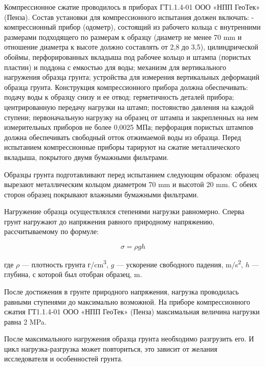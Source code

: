 Компрессионное сжатие проводилось в приборах ГТ1.1.4-01 ООО «НПП ГеоТек» (Пенза).
Состав установки для компрессионного испытания должен включать: 
- компрессионный прибор (одометр), состоящий из рабочего кольца с
внутренними размерами подходящего по размерам к образцу (диаметр не менее 70 \si{\milli\meter} 
и отношение диаметра к высоте должно составлять от 2,8 до 3,5), цилиндрической обоймы,
перфорированных вкладыша под рабочее кольцо и штампа (пористых
пластин) и поддона с емкостью для воды; механизм для вертикального нагружения образца грунта; 
устройства для измерения вертикальных деформаций образца грунта.
Конструкция компрессионного прибора должна обеспечивать: подачу воды к образцу снизу и ее отвод; 
герметичность деталей прибора; центрированную передачу нагрузки на штамп; постоянство давления 
на каждой ступени; первоначальную нагрузку на образец от штампа и закрепленных на нем
измерительных приборов не более 0,0025 МПа; перфорация пористых штампов должна 
обеспечивать свободный отток отжимаемой воды из образца.
Перед испытанием компрессионные приборы тарируют на сжатие металлического 
вкладыша, покрытого двумя бумажными фильтрами.

Образцы грунта подготавливают перед испытанием следующим образом:
образец вырезают металлическим кольцом диаметром 70 \si{\milli\meter} 
и высотой 20 \si{\milli\meter}. С обеих сторон образец покрывают 
влажными бумажными фильтрами. 

Нагружение образца осуществлялся степенями нагрузки равномерно. 
Сперва грунт нагружают до напряжения равного природному 
напряжению, рассчитываемому по формуле: 

\[
   \sigma = \rho g h
\]

где $\rho$ --- плотность грунта г/\si{\centi\meter^3},
$g$ --- ускорение свободного падения, \si{\meter}/\si{\second^2},
$h$ --- глубина, с которой был отобран образец, \si{\meter}.

После достижения в грунте природного напряжения, нагрузка 
проводилась равными ступенями до максимально возможной. На приборе 
компрессионного сжатия ГТ1.1.4-01 ООО «НПП ГеоТек» (Пенза) максимальная 
величина нагрузки равна 2 \si{\mega\pascal}.

После максимального нагружения образца грунта необходимо разгрузить
его. И цикл нагрузка-разгрузка может повториться, это зависит от 
желания исследователя и особенностей грунта.


